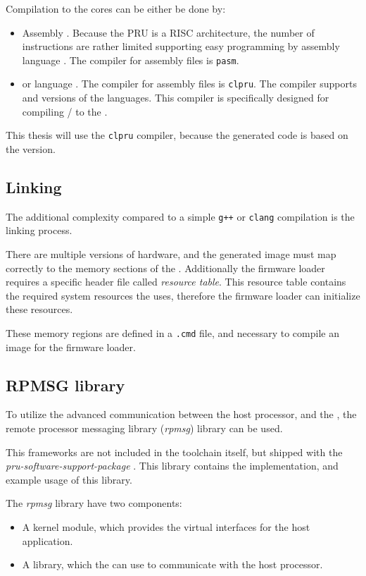Compilation to the \pru{} cores can be either be done by:
\begin{itemize}
	\item Assembly \citep{PRU_ASM}. Because the PRU is a RISC architecture, the number of instructions are rather limited supporting easy programming by assembly language \citep{PRU_ASM_INSTR}. The compiler for assembly files is \verb+pasm+.
	\item \cpl{} or \cpp{} language \citep{PRU_C_CPP}. The compiler for assembly files is \verb+clpru+. The compiler supports  and  versions of the languages. This compiler is specifically designed for compiling \cpl{}/\cpp{} to the \pru.
\end{itemize}
This thesis will use the \verb+clpru+ compiler, because the generated code is based on the  version.

\subsection{Linking}
\label{subs:linking}

The additional complexity compared to a simple \verb/g++/ or \verb/clang/ compilation is the linking process.

There are multiple versions of \pru{} hardware, and the generated image must map correctly to the memory sections of the \pru. Additionally the firmware loader requires a specific header file called \emph{resource table}. This resource table contains the required system resources the \pru{} uses, therefore the firmware loader can initialize these resources.

These memory regions are defined in a \verb+.cmd+ file, and necessary to compile an \elf{} image for the firmware loader.

\subsection{RPMSG library}

To utilize the advanced communication between the host processor, and the \pru, the remote processor messaging library (\emph{rpmsg}) library can be used.

This frameworks are not included in the \pru{} \cpp{} toolchain itself, but shipped with the \emph{pru-software-support-package} \citep{TI_PRUSS_REPO}. This library contains the implementation, and example usage of this library.

The \emph{rpmsg} library have two components:
\begin{itemize}
	\item A kernel module, which provides the virtual interfaces for the host application.
	\item A \cpl{} library, which the \pru{} can use to communicate with the host processor.
\end{itemize}

